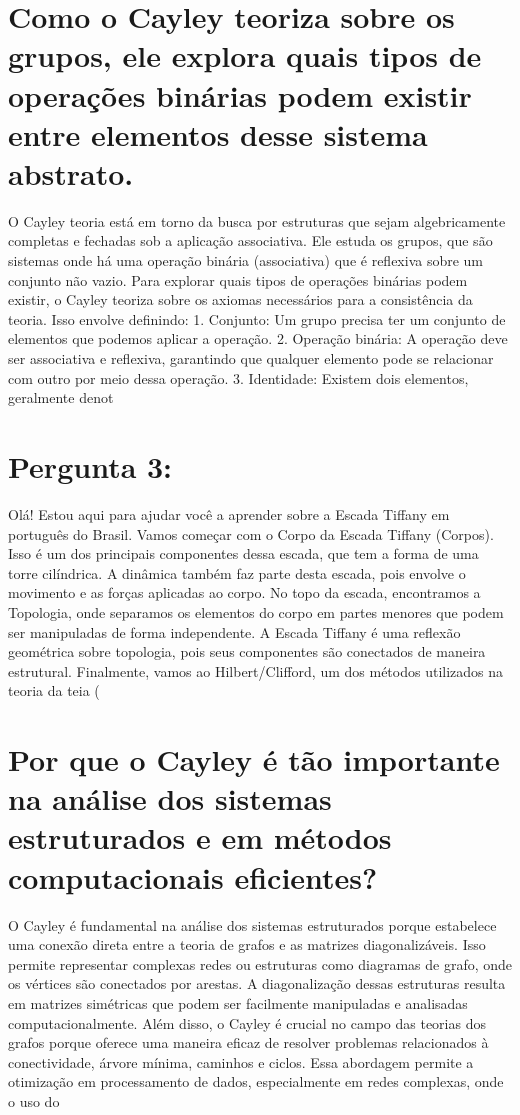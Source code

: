 \documentclass[11pt,a4paper]{article}
\begin{document}
\section{Como o Cayley teoriza sobre os grupos, ele explora quais tipos de operações binárias podem existir entre elementos desse sistema abstrato.}
O Cayley teoria está em torno da busca por estruturas que sejam algebricamente completas e fechadas sob a aplicação associativa. Ele estuda os grupos, que são sistemas onde há uma operação binária (associativa) que é reflexiva sobre um conjunto não vazio. Para explorar quais tipos de operações binárias podem existir, o Cayley teoriza sobre os axiomas necessários para a consistência da teoria. Isso envolve definindo: 1. Conjunto: Um grupo precisa ter um conjunto de elementos que podemos aplicar a operação. 2. Operação binária: A operação deve ser associativa e reflexiva, garantindo que qualquer elemento pode se relacionar com outro por meio dessa operação. 3. Identidade: Existem dois elementos, geralmente denot

\section{Pergunta 3:}
Olá! Estou aqui para ajudar você a aprender sobre a Escada Tiffany em português do Brasil. Vamos começar com o Corpo da Escada Tiffany (Corpos). Isso é um dos principais componentes dessa escada, que tem a forma de uma torre cilíndrica. A dinâmica também faz parte desta escada, pois envolve o movimento e as forças aplicadas ao corpo. No topo da escada, encontramos a Topologia, onde separamos os elementos do corpo em partes menores que podem ser manipuladas de forma independente. A Escada Tiffany é uma reflexão geométrica sobre topologia, pois seus componentes são conectados de maneira estrutural. Finalmente, vamos ao Hilbert/Clifford, um dos métodos utilizados na teoria da teia (

\section{Por que o Cayley é tão importante na análise dos sistemas estruturados e em métodos computacionais eficientes?}
O Cayley é fundamental na análise dos sistemas estruturados porque estabelece uma conexão direta entre a teoria de grafos e as matrizes diagonalizáveis. Isso permite representar complexas redes ou estruturas como diagramas de grafo, onde os vértices são conectados por arestas. A diagonalização dessas estruturas resulta em matrizes simétricas que podem ser facilmente manipuladas e analisadas computacionalmente. Além disso, o Cayley é crucial no campo das teorias dos grafos porque oferece uma maneira eficaz de resolver problemas relacionados à conectividade, árvore mínima, caminhos e ciclos. Essa abordagem permite a otimização em processamento de dados, especialmente em redes complexas, onde o uso do
\end{document}
